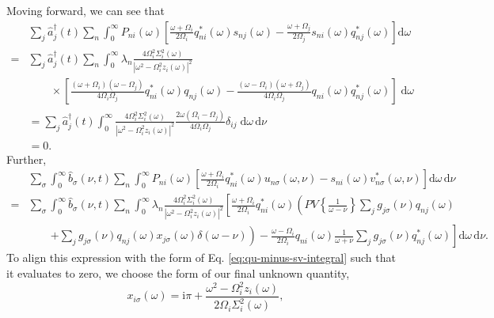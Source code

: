 Moving forward, we can see that
\begin{equation}
\begin{split}
&\sum_j\hat{a}_j^\dagger(t)\sum_n\int_0^\infty P_{ni}(\omega)\left[\frac{\omega + \Omega_i}{2\Omega_i}q_{ni}^*(\omega)s_{nj}(\omega) - \frac{\omega + \Omega_j}{2\Omega_j}s_{ni}(\omega)q_{nj}^*(\omega)\right]\mathrm{d}\omega\\
= &\sum_j\hat{a}_j^\dagger(t)\sum_n\int_0^\infty \lambda_n\frac{4\Omega_i^2\Sigma_i^2(\omega)}{|\omega^2 - \Omega_i^2z_i(\omega)|^2}\\
&\qquad\times\left[\frac{(\omega + \Omega_i)(\omega - \Omega_j)}{4\Omega_i\Omega_j}q_{ni}^*(\omega)q_{nj}(\omega) - \frac{(\omega - \Omega_i)(\omega + \Omega_j)}{4\Omega_i\Omega_j}q_{ni}(\omega)q_{nj}^*(\omega)\right]\;\mathrm{d}\omega\\
&= \sum_j\hat{a}_j^\dagger(t)\int_0^\infty\frac{4\Omega_i^2\Sigma_i^2(\omega)}{|\omega^2 - \Omega_i^2z_i(\omega)|^2}\frac{2\omega(\Omega_i - \Omega_j)}{4\Omega_i\Omega_j}\delta_{ij}\;\mathrm{d}\omega\,\mathrm{d}\nu\\
&= 0.
\end{split}
\end{equation}
Further,
\begin{equation}
\begin{split}
&\sum_\sigma\int_0^\infty\hat{b}_\sigma(\nu,t)\sum_n\int_0^\infty P_{ni}(\omega)\left[\frac{\omega + \Omega_i}{2\Omega_i}q_{ni}^*(\omega)u_{n\sigma}(\omega,\nu) - s_{ni}(\omega)v_{n\sigma}^*(\omega,\nu)\right]\mathrm{d}\omega\,\mathrm{d}\nu\\
= &\sum_\sigma\int_0^\infty\hat{b}_\sigma(\nu,t)\sum_n\int_0^\infty \lambda_n\frac{4\Omega_i^2\Sigma_i^2(\omega)}{|\omega^2 - \Omega_i^2z_i(\omega)|^2}\left[\frac{\omega + \Omega_i}{2\Omega_i}q_{ni}^*(\omega)\left(PV\left\{\frac{1}{\omega - \nu }\right\}\sum_jg_{j\sigma}(\nu)q_{nj}(\omega)\right.\right.\\
&\qquad\left.\left. + \sum_jg_{j\sigma}(\nu)q_{nj}(\omega)x_{j\sigma}(\omega)\delta(\omega - \nu )\right) - \frac{\omega - \Omega_i}{2\Omega_i}q_{ni}(\omega)\frac{1}{\omega + \nu }\sum_jg_{j\sigma}(\nu)q_{nj}^*(\omega)\right]\mathrm{d}\omega\,\mathrm{d}\nu.
\end{split}
\end{equation}
To align this expression with the form of Eq. \eqref{eq:qu-minus-sv-integral} such that it evaluates to zero, we choose the form of our final unknown quantity,
\begin{equation}
x_{i\sigma}(\omega) = \mathrm{i}\pi + \frac{\omega^2 - \Omega_i^2z_i(\omega)}{2\Omega_i\Sigma_i^2(\omega)},
\end{equation}
